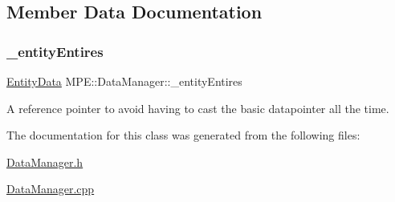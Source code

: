 \subsection{Member Data Documentation}
\mbox{\label{class_m_p_e_1_1_data_manager_a7c31d54443c2ff3dc77e2bf392de09ef}} 
\subsubsection{\texorpdfstring{\+\_\+entity\+Entires}{\_entityEntires}}
{\footnotesize\ttfamily \hyperlink{struct_m_p_e_1_1_data_manager_1_1_entity_data}{Entity\+Data} M\+P\+E\+::\+Data\+Manager\+::\+\_\+entity\+Entires\hspace{0.3cm}{\ttfamily [private]}}

A reference pointer to avoid having to cast the basic datapointer all the time. 

The documentation for this class was generated from the following files\+:\begin{DoxyCompactItemize}
\item 
\hyperlink{_data_manager_8h}{Data\+Manager.\+h}\item 
\hyperlink{_data_manager_8cpp}{Data\+Manager.\+cpp}\end{DoxyCompactItemize}
